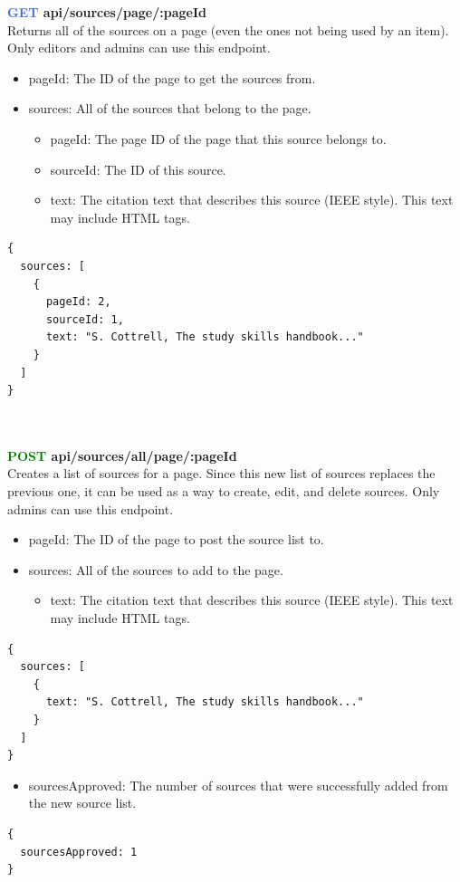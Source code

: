 \documentclass[onecolumn, draftclsnofoot,10pt, compsoc, usenames, dvipsnames]{IEEEtran}
\begin{document}
\noindent
\textbf{\textcolor{RoyalBlue}{GET} api/sources/page/:pageId} \\
Returns all of the sources on a page (even the ones not being used by an item). Only editors and admins can use this endpoint.
\begin{itemize}
    \item pageId: The ID of the page to get the sources from.
    \item sources: All of the sources that belong to the page.
    \begin{itemize}
        \item pageId: The page ID of the page that this source belongs to.
        \item sourceId: The ID of this source.
        \item text: The citation text that describes this source (IEEE style). This text may include HTML tags.
    \end{itemize}
\end{itemize}
\begin{lstlisting}[caption=Example Response]
{
  sources: [
    {
      pageId: 2,
      sourceId: 1,
      text: "S. Cottrell, The study skills handbook..."
    }
  ]
}
\end{lstlisting}
\\~\\


\noindent
\textbf{\textcolor{Green}{POST} api/sources/all/page/:pageId} \\
Creates a list of sources for a page. Since this new list of sources replaces the previous one, it can be used as a way to create, edit, and delete sources. Only admins can use this endpoint.
\begin{itemize}
    \item pageId: The ID of the page to post the source list to.
    \item sources: All of the sources to add to the page.
    \begin{itemize}
        \item text: The citation text that describes this source (IEEE style). This text may include HTML tags.
    \end{itemize}
\end{itemize}
\begin{lstlisting}[caption=Example Request Body]
{ 
  sources: [
    {
      text: "S. Cottrell, The study skills handbook..."
    }
  ]
}
\end{lstlisting}
\begin{itemize}
    \item sourcesApproved: The number of sources that were successfully added from the new source list.
\end{itemize}
\begin{lstlisting}[caption=Example Response]
{ 
  sourcesApproved: 1
}
\end{lstlisting}
\\~\\
\end{document}
